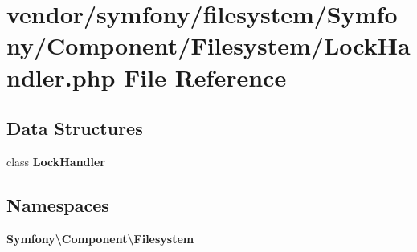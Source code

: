 \section{vendor/symfony/filesystem/\+Symfony/\+Component/\+Filesystem/\+Lock\+Handler.php File Reference}
\label{_lock_handler_8php}
\subsection*{Data Structures}
\begin{DoxyCompactItemize}
\item 
class {\bf Lock\+Handler}
\end{DoxyCompactItemize}
\subsection*{Namespaces}
\begin{DoxyCompactItemize}
\item 
 {\bf Symfony\textbackslash{}\+Component\textbackslash{}\+Filesystem}
\end{DoxyCompactItemize}
